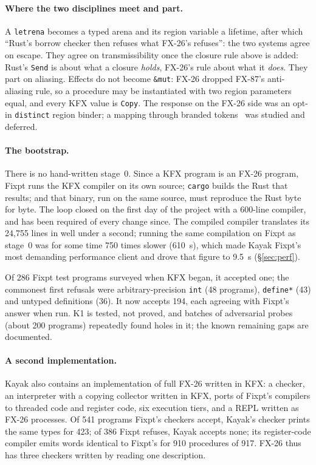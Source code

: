 \documentclass[acmsmall,screen,review]{acmart}
\newcommand{\cd}[1]{\texttt{#1}}
\newcommand{\fx}{FX-26}
\begin{document}
\paragraph{Where the two disciplines meet and part.} A \cd{letrena}
becomes a typed arena and its region variable a lifetime, after which
``Rust's borrow checker then refuses what \fx's refuses'': the two
systems agree on escape. They agree on transmissibility once the
closure rule above is added: Rust's \cd{Send} is about what a closure
\emph{holds}, \fx's rule about what it \emph{does}. They part on
aliasing. Effects do not become \cd{\&mut}: \fx{} dropped FX-87's
anti-aliasing rule, so a procedure may be instantiated with two region
parameters equal, and every KFX value is \cd{Copy}. The response on the
\fx{} side was an opt-in \cd{distinct} region binder; a mapping through
branded tokens~\cite{ghostcell} was studied and deferred.

\paragraph{The bootstrap.} There is no hand-written stage~0. Since a KFX
program is an \fx{} program, Fixpt runs the KFX compiler on its own
source; \cd{cargo} builds the Rust that results; and that binary, run on
the same source, must reproduce the Rust byte for byte. The loop closed
on the first day of the project with a 600-line compiler, and has been
required of every change since. The compiled compiler translates its
24,755 lines in well under a second; running the same compilation on
Fixpt as stage~0 was for some time 750 times slower (610~s), which
made Kayak Fixpt's most demanding performance client and drove that
figure to 9.5~s (\S\ref{sec:perf}).

Of 286 Fixpt test programs surveyed when KFX began, it accepted one;
the commonest first refusals were arbitrary-precision \cd{int} (48 programs),
\cd{define*} (43) and untyped definitions (36). It now accepts 194,
each agreeing with Fixpt's answer when run. K1 is tested, not proved,
and batches of adversarial probes (about 200 programs) repeatedly found
holes in it; the known remaining gaps are documented.

\paragraph{A second implementation.} Kayak also contains an
implementation of full \fx{} written in KFX: a checker, an interpreter
with a copying collector written in KFX, ports of Fixpt's compilers to
threaded code and register code, six execution tiers, and a REPL
written as \fx{} processes. Of 541 programs Fixpt's checkers accept,
Kayak's checker prints the same types for 423; of 386 Fixpt refuses,
Kayak accepts none; its register-code compiler emits words identical to
Fixpt's for 910 procedures of 917. \fx{} thus has three checkers
written by reading one description.
\end{document}
